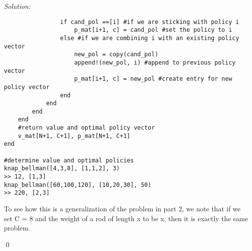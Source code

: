 \documentclass[12pt]{article}
\newenvironment{problem}[2][Problem]{\begin{trivlist}
       \item[\hskip \labelsep {\bfseries #1}\hskip \labelsep {\bfseries #2.}]}{\end{trivlist}}
\newenvironment{sol}
           {\emph{Solution:}
           }
           {
           \qed
           }
\begin{document}
\begin{sol}
\begin{lstlisting}
                if cand_pol ==[i] #if we are sticking with policy i
                    p_mat[i+1, c] = cand_pol #set the policy to i
                else #if we are combining i with an existing policy vector
                    new_pol = copy(cand_pol)
                    append!(new_pol, i) #append to previous policy vector
                    p_mat[i+1, c] = new_pol #create entry for new policy vector
                end
            end
        end
    end
    #return value and optimal policy vector
    v_mat[N+1, C+1], p_mat[N+1, C+1]
end

#determine value and optimal policies
knap_bellman([4,3,8], [1,1,2], 3)
>> 12, [1,3]
knap_bellman([60,100,120], [10,20,30], 50)
>> 220, [2,3]
        \end{lstlisting}
To see how this is a generalization of the problem in part 2, we note that if we set C = 8 and the weight of a rod of length x to be x, then it is exactly the same problem. 
       \end{sol}
       \begin{problem}{4}
        
       \end{problem}
\end{document}
